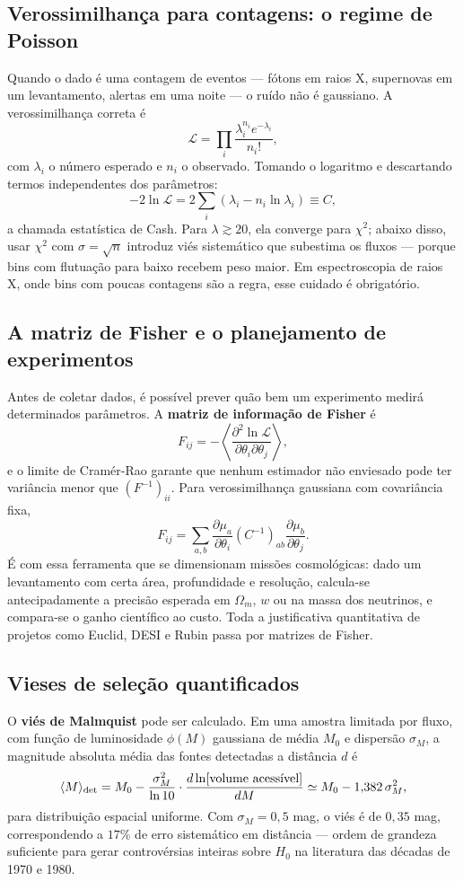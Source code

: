 \documentclass[11pt,a4paper]{article}
\begin{document}
\subsection*{Verossimilhança para contagens: o regime de Poisson}

Quando o dado é uma contagem de eventos --- fótons em raios X, supernovas em um levantamento, alertas em uma noite --- o ruído não é gaussiano. A verossimilhança correta é
\[
\mathcal{L}=\prod_i\frac{\lambda_i^{n_i}e^{-\lambda_i}}{n_i!},
\]
com $\lambda_i$ o número esperado e $n_i$ o observado. Tomando o logaritmo e descartando termos independentes dos parâmetros:
\[
-2\ln\mathcal{L}=2\sum_i\left(\lambda_i-n_i\ln\lambda_i\right)\equiv C,
\]
a chamada estatística de Cash. Para $\lambda\gtrsim20$, ela converge para $\chi^{2}$; abaixo disso, usar $\chi^{2}$ com $\sigma=\sqrt{n}$ introduz viés sistemático que subestima os fluxos --- porque bins com flutuação para baixo recebem peso maior. Em espectroscopia de raios X, onde bins com poucas contagens são a regra, esse cuidado é obrigatório.

\subsection*{A matriz de Fisher e o planejamento de experimentos}

Antes de coletar dados, é possível prever quão bem um experimento medirá determinados parâmetros. A \textbf{matriz de informação de Fisher} é
\[
F_{ij}=-\left\langle\frac{\partial^{2}\ln\mathcal{L}}{\partial\theta_i\partial\theta_j}\right\rangle,
\]
e o limite de Cramér-Rao garante que nenhum estimador não enviesado pode ter variância menor que $(F^{-1})_{ii}$. Para verossimilhança gaussiana com covariância fixa,
\[
F_{ij}=\sum_{a,b}\frac{\partial\mu_a}{\partial\theta_i}\left(C^{-1}\right)_{ab}\frac{\partial\mu_b}{\partial\theta_j}.
\]
É com essa ferramenta que se dimensionam missões cosmológicas: dado um levantamento com certa área, profundidade e resolução, calcula-se antecipadamente a precisão esperada em $\Omega_m$, $w$ ou na massa dos neutrinos, e compara-se o ganho científico ao custo. Toda a justificativa quantitativa de projetos como Euclid, DESI e Rubin passa por matrizes de Fisher.

\subsection*{Vieses de seleção quantificados}

O \textbf{viés de Malmquist} pode ser calculado. Em uma amostra limitada por fluxo, com função de luminosidade $\phi(M)$ gaussiana de média $M_0$ e dispersão $\sigma_M$, a magnitude absoluta média das fontes detectadas a distância $d$ é
\[
\langle M\rangle_{\rm det}=M_0-\frac{\sigma_M^{2}}{\ln 10}\cdot\frac{d\ln[\text{volume acessível}]}{dM}\simeq M_0-1{,}382\,\sigma_M^{2},
\]
para distribuição espacial uniforme. Com $\sigma_M=0{,}5$ mag, o viés é de $0{,}35$ mag, correspondendo a $17\%$ de erro sistemático em distância --- ordem de grandeza suficiente para gerar controvérsias inteiras sobre $H_0$ na literatura das décadas de 1970 e 1980.
\end{document}

